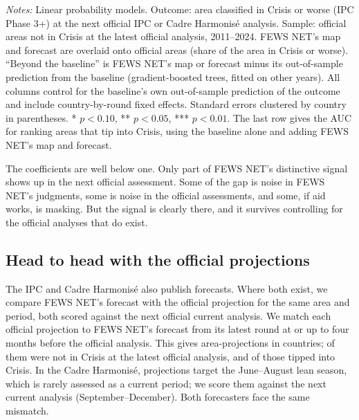 \documentclass[11pt]{article}
\begin{document}
\begin{table}[t]
\centering

\caption{Is FEWS NET's distinctive information borne out by independent assessments?}\label{tab:contribution}
\scriptsize
\resizebox{\textwidth}{!}{}
\par\vspace{4pt}\begin{minipage}{\textwidth}\scriptsize \textit{Notes:} Linear probability models. Outcome: area classified in Crisis or worse (IPC Phase 3+) at the next official IPC or Cadre Harmonis\'e analysis. Sample: official areas not in Crisis at the latest official analysis, 2011--2024. FEWS NET's map and forecast are overlaid onto official areas (share of the area in Crisis or worse). ``Beyond the baseline'' is FEWS NET's map or forecast minus its out-of-sample prediction from the baseline (gradient-boosted trees, fitted on other years). All columns control for the baseline's own out-of-sample prediction of the outcome and include country-by-round fixed effects. Standard errors clustered by country in parentheses. * $p<0.10$, ** $p<0.05$, *** $p<0.01$. The last row gives the AUC for ranking areas that tip into Crisis, using the baseline alone and adding FEWS NET's map and forecast.
\end{minipage}

\end{table}

The coefficients are well below one. Only part of FEWS NET's distinctive signal shows up in the next official assessment. Some of the gap is noise in FEWS NET's judgments, some is noise in the official assessments, and some, if aid works, is masking. But the signal is clearly there, and it survives controlling for the official analyses that do exist.

\subsection{Head to head with the official projections}

The IPC and Cadre Harmonis\'e also publish forecasts. Where both exist, we compare FEWS NET's forecast with the official projection for the same area and period, both scored against the next official current analysis. We match each official projection to FEWS NET's forecast from its latest round at or up to four months before the official analysis. This gives \offNall{} area-projections in \offCountriesAll{} countries; \offN{} of them were not in Crisis at the latest official analysis, and \offNew{} of those tipped into Crisis. In the Cadre Harmonis\'e, projections target the June--August lean season, which is rarely assessed as a current period; we score them against the next current analysis (September--December). Both forecasters face the same mismatch.
\end{document}
